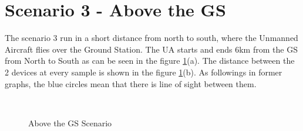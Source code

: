 \newpage
\section{Scenario 3 - Above the GS}\label{sec:scenario3}
The scenario 3 run in a short distance from north to south, where the Unmanned Aircraft flies over the Ground Station. The UA starts and ends 6km from the GS from North to South as can be seen in the figure \ref{fig:s3_map}(a). The distance between the 2 devices at every sample is shown in the figure \ref{fig:s3_map}(b). As followings in former graphs, the blue circles mean that there is line of sight between them. 


\begin{figure}[H]
	\centering
	\\
	\caption{Above the GS Scenario}
	\label{fig:s3_map}
\end{figure}

